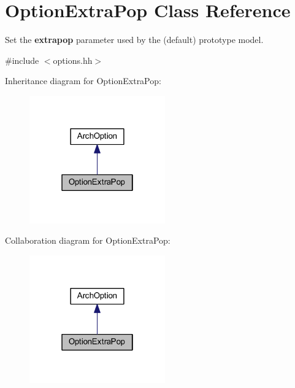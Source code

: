 \hypertarget{class_option_extra_pop}{}\section{Option\+Extra\+Pop Class Reference}
\label{class_option_extra_pop}


Set the {\bfseries{extrapop}} parameter used by the (default) prototype model.  




{\ttfamily \#include $<$options.\+hh$>$}



Inheritance diagram for Option\+Extra\+Pop\+:
\nopagebreak
\begin{figure}[H]
\begin{center}
\leavevmode
\includegraphics[width=166pt]{class_option_extra_pop__inherit__graph}
\end{center}
\end{figure}


Collaboration diagram for Option\+Extra\+Pop\+:
\nopagebreak
\begin{figure}[H]
\begin{center}
\leavevmode
\includegraphics[width=166pt]{class_option_extra_pop__coll__graph}
\end{center}
\end{figure}
